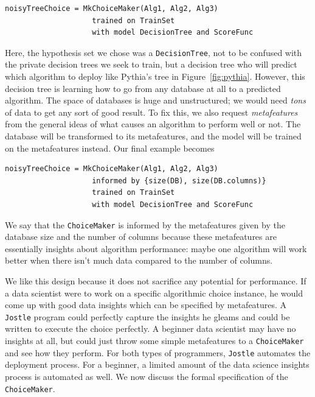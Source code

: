 \documentclass[11pt]{report}
\newcommand{\Jostle}{\texttt{Jostle}}
\renewcommand{\t}[1]{\texttt{#1}}
\begin{document}
\begin{lstlisting}[style=MyPythonStyle]
noisyTreeChoice = MkChoiceMaker(Alg1, Alg2, Alg3)
                    trained on TrainSet 
                    with model DecisionTree and ScoreFunc
\end{lstlisting} 
Here, the hypothesis set we chose was a \t{DecisionTree}, not to be confused with the private decision trees we seek to train, but a decision tree who will predict which algorithm to deploy like Pythia's tree in Figure~\ref{fig:pythia}. However, this decision tree is learning how to go from any database at all to a predicted algorithm. The space of databases is huge and unstructured; we would need \emph{tons} of data to get any sort of good result. To fix this, we also request \emph{metafeatures} from the general ideas of what causes an algorithm to perform well or not. The database will be transformed to its metafeatures, and the model will be trained on the metafeatures instead. Our final example becomes
\begin{lstlisting}[style=MyPythonStyle]
noisyTreeChoice = MkChoiceMaker(Alg1, Alg2, Alg3)
                    informed by {size(DB), size(DB.columns)}
                    trained on TrainSet 
                    with model DecisionTree and ScoreFunc
\end{lstlisting} 
We say that the \t{ChoiceMaker} is informed by the metafeatures given by the database size and the number of columns because these metafeatures are essentially insights about algorithm performance: maybe one algorithm will work better when there isn't much data compared to the number of columns. 

We like this design because it does not sacrifice any potential for performance. If a data scientist were to work on a specific algorithmic choice instance, he would come up with good data insights which can be specified by metafeatures. A \Jostle{} program could perfectly capture the insights he gleams and could be written to execute the choice perfectly. A beginner data scientist may have no insights at all, but could just throw some simple metafeatures to a \t{ChoiceMaker} and see how they perform. For both types of programmers, \Jostle{} automates the deployment process. For a beginner, a limited amount of the data science insights process is automated as well. We now discuss the formal specification of the \t{ChoiceMaker}.
\end{document}

